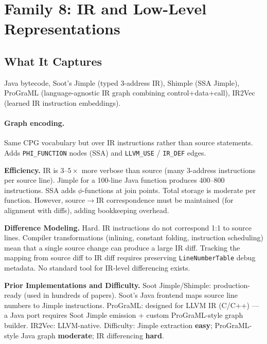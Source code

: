 \documentclass[12pt,a4paper]{article}
\begin{document}
\section{Family 8: IR and Low-Level Representations}

\subsection{What It Captures}

Java bytecode, Soot's Jimple (typed 3-address IR), Shimple (SSA Jimple),
ProGraML (language-agnostic IR graph combining control+data+call), IR2Vec
(learned IR instruction embeddings).

\paragraph{Graph encoding.}
Same CPG vocabulary but over IR instructions rather than source statements.
Adds \texttt{PHI\_FUNCTION} nodes (SSA) and \texttt{LLVM\_USE} / \texttt{IR\_DEF}
edges.

\begin{effbox}
\textbf{Efficiency.}
IR is $3$--$5\times$ more verbose than source (many 3-address instructions per
source line). Jimple for a 100-line Java function produces 400--800 instructions.
SSA adds $\phi$-functions at join points. Total storage is moderate per function.
However, source$\to$IR correspondence must be maintained (for alignment with
diffs), adding bookkeeping overhead.
\end{effbox}

\begin{diffbox}
\textbf{Difference Modeling.}
Hard. IR instructions do not correspond 1:1 to source lines. Compiler
transformations (inlining, constant folding, instruction scheduling) mean that
a single source change can produce a large IR diff. Tracking the mapping
from source diff to IR diff requires preserving \texttt{LineNumberTable}
debug metadata. No standard tool for IR-level differencing exists.
\end{diffbox}

\begin{implbox}
\textbf{Prior Implementations and Difficulty.}
Soot Jimple/Shimple: production-ready (used in hundreds of papers). Soot's
Java frontend maps source line numbers to Jimple instructions.
ProGraML: designed for LLVM IR (C/C++) --- a Java port requires Soot Jimple
emission + custom ProGraML-style graph builder. IR2Vec: LLVM-native.
Difficulty: Jimple extraction \textbf{easy}; ProGraML-style Java graph
\textbf{moderate}; IR differencing \textbf{hard}.
\end{implbox}
\end{document}
